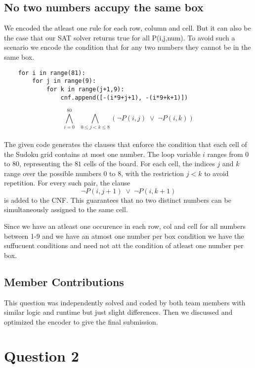 \documentclass[12pt,a4paper]{article}
\begin{document}
\subsection*{No two numbers accupy the same box}
We encoded the atleast one rule for each row, column and cell. But it can also be the case that our SAT solver returns true for all P(i,j,num). To avoid such a scenario we encode the condition that for any two numbers they cannot be in the same box.

\begin{lstlisting}
    for i in range(81):
        for j in range(9):
            for k in range(j+1,9):
                cnf.append([-(i*9+j+1), -(i*9+k+1)])        

\end{lstlisting}
\[
\bigwedge_{i=0}^{80} \;\;
\bigwedge_{0 \leq j < k \leq 8}
\left(
  \lnot P(i,j) \;\lor\; \lnot P(i,k)
\right)
\]

\paragraph{}  
The given code generates the clauses that enforce the condition that each cell of the Sudoku grid contains at most one number. The loop variable $i$ ranges from $0$ to $80$, representing the $81$ cells of the board. For each cell, the indices $j$ and $k$ range over the possible numbers $0$ to $8$, with the restriction $j < k$ to avoid repetition. For every such pair, the clause  
\[
\lnot P(i,j+1) \;\lor\; \lnot P(i,k+1)
\]  
is added to the CNF. This guarantees that no two distinct numbers can be simultaneously assigned to the same cell.


Since we have an atleast one occurence in each row, col and cell for all numbers between 1-9 and we have an atmost one number per box condition we have the suffucuent conditions and need not att the condition of atleast one number per box.

\subsection*{Member Contributions}
This question was independently solved and coded by both team members with similar logic and runtime but just slight differences.
Then we discussed and optimized the encoder to give the final submission. 
\newpage
\section*{Question 2}
\end{document}
